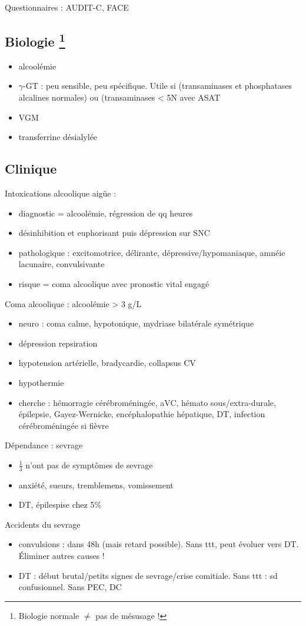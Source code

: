 \documentclass[11pt]{article}
\begin{document}
Questionnaires : AUDIT-C, FACE
\subsection{Biologie \footnote{Biologie normale \(\ne\) pas de mésusage !}}
\label{sec:org7563e8c}
\begin{itemize}
\item alcoolémie
\item \(\gamma\)-GT : peu sensible, peu spécifique. Utile si (transaminases et
phosphatases alcalines normales) ou (transaminases < 5N avec \inc{} ASAT
\item VGM
\item transferrine désialylée
\end{itemize}
\subsection{Clinique}
\label{sec:org6cb05d4}
Intoxications alcoolique aigüe : 
\begin{itemize}
\item diagnostic = alcoolémie, régression de qq heures
\item désinhibition et euphorisant puis dépression sur SNC
\item pathologique : excitomotrice, délirante, dépressive/hypomaniaque, amnéie
lacunaire, convulsivante
\item risque = coma alcoolique avec pronostic vital engagé
\end{itemize}
Coma alcoolique : alcoolémie > 3 g/L
\begin{itemize}
\item neuro : coma calme, hypotonique, mydriase bilatérale symétrique
\item dépression repsiration
\item hypotension artérielle, bradycardie, collapsus CV
\item hypothermie
\item \danger cherche : hémorragie cérébroméningée, aVC, hémato sous/extra-durale,
épilepsie, Gayez-Wernicke, encéphalopathie hépatique, \gls{DT}, infection
cérébroméningée si fièvre
\end{itemize}
Dépendance : sevrage
\begin{itemize}
\item \(\frac{1}{3}\) n'ont pas de symptômes de sevrage
\item anxiété, sueurs, tremblemens, vomissement
\item \gls{DT}, épilespise chez 5\%
\end{itemize}
Accidents du sevrage
\begin{itemize}
\item convulsions : dans 48h (mais retard possible). Sans ttt, peut évoluer vers
DT. Éliminer autres causes !
\item DT : début brutal/petits signes de sevrage/crise comitiale. Sans ttt : sd
confusionnel. Sans PEC, DC 
\end{itemize}
\end{document}
